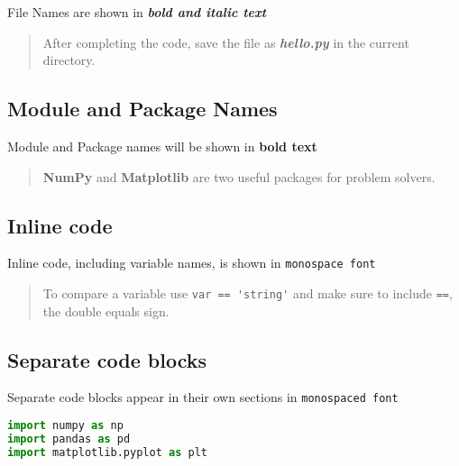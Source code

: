 \documentclass{book}
\newcommand{\passthrough}[1]{#1}
\begin{document}
File Names are shown in \textbf{\emph{bold and italic text}}

\begin{quote}
After completing the code, save the file as \textbf{\emph{hello.py}} in
the current directory.
\end{quote}
    




    
        \hypertarget{module-and-package-names}{%
\subsection{Module and Package Names}\label{module-and-package-names}}

Module and Package names will be shown in \textbf{bold text}

\begin{quote}
\textbf{NumPy} and \textbf{Matplotlib} are two useful packages for
problem solvers.
\end{quote}
    




    
        \hypertarget{inline-code}{%
\subsection{Inline code}\label{inline-code}}

Inline code, including variable names, is shown in
\passthrough{\lstinline!monospace font!}

\begin{quote}
To compare a variable use \passthrough{\lstinline!var == 'string'!} and
make sure to include \passthrough{\lstinline!==!}, the double equals
sign.
\end{quote}
    




    
        \hypertarget{separate-code-blocks}{%
\subsection{Separate code blocks}\label{separate-code-blocks}}

Separate code blocks appear in their own sections in
\passthrough{\lstinline!monospaced font!}

\begin{lstlisting}[language=Python]
import numpy as np
import pandas as pd
import matplotlib.pyplot as plt
\end{lstlisting}
    
\end{document}
